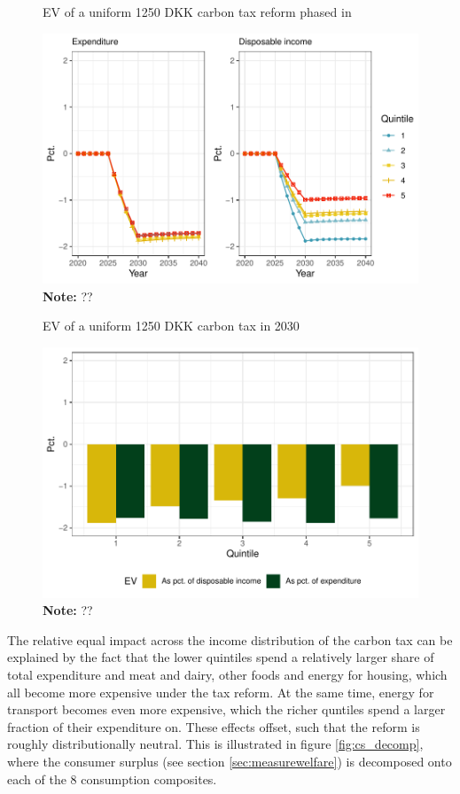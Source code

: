 \begin{figure}[H]
\centering
\caption{EV of a uniform 1250 DKK carbon tax reform phased in}
\label{figshare_1250}
\includegraphics[width=.7\textwidth]{Figures/IO-resultater/timeEV_1250_indfas.pdf}
\captionsetup{singlelinecheck=off,size=scriptsize}
\setlength{\captionmargin}{10pt}
\caption*{
\textbf{Note:} ??\\}
\end{figure}

\begin{figure}[H]
\centering
\caption{EV of a uniform 1250 DKK carbon tax in 2030}
\label{figshare_bar_1250}
\includegraphics[width=.7\textwidth]{Figures/IO-resultater/bar2030_1250_indfas.pdf}
\captionsetup{singlelinecheck=off,size=scriptsize}
\setlength{\captionmargin}{10pt}
\caption*{
\textbf{Note:} ??\\}
\end{figure}
The relative equal impact across the income distribution of the carbon tax can be explained by the fact that the lower quintiles spend a relatively larger share of total expenditure and meat and dairy, other foods and energy for housing, which all become more expensive under the tax reform. At the same time, energy for transport becomes even more expensive, which the richer quntiles spend a larger fraction of their expenditure on. These effects offset, such that the reform is roughly distributionally neutral. This is illustrated in figure \ref{fig:cs_decomp}, where the consumer surplus (see section \ref{sec:measurewelfare}) is decomposed onto each of the 8 consumption composites. 

